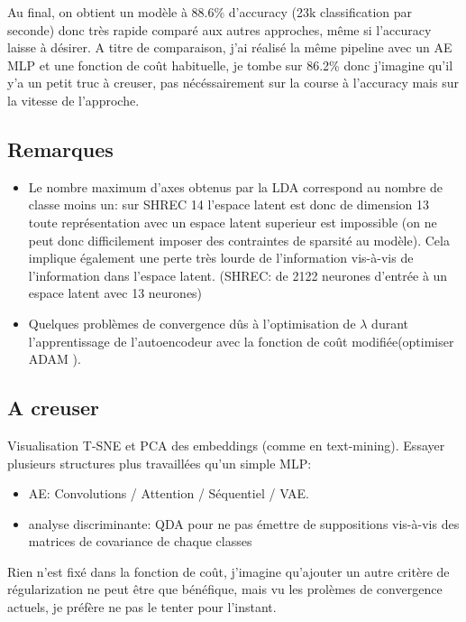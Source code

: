 Au final, on obtient un modèle à 88.6\% d'accuracy (23k classification par seconde) donc très rapide comparé aux autres approches, même si l'accuracy laisse à désirer. A titre de comparaison, j'ai réalisé la même pipeline avec un AE MLP et une fonction de coût habituelle, je tombe sur 86.2\% donc j'imagine qu'il y'a un petit truc à creuser, pas nécéssairement sur la course à l'accuracy mais sur la vitesse de l'approche.

\subsection{Remarques}
\begin{itemize}
    \item Le nombre maximum d'axes obtenus par la LDA correspond au nombre de classe moins un: sur SHREC 14 l'espace latent est donc de dimension 13 toute représentation avec un espace latent superieur est impossible (on ne peut donc difficilement imposer des contraintes de sparsité au modèle). Cela implique également une perte très lourde de l'information vis-à-vis de l'information dans l'espace latent. (SHREC: de 2122 neurones d'entrée à un espace latent avec 13 neurones)
    \item Quelques problèmes de convergence dûs à l'optimisation de $\lambda$ durant l'apprentissage de l'autoencodeur avec la fonction de coût modifiée(optimiser ADAM \cite{kingma2014adam}).
\end{itemize}

\subsection{A creuser}



Visualisation T-SNE et PCA des embeddings (comme en text-mining).
Essayer plusieurs structures plus travaillées qu'un simple MLP:
\begin{itemize}
    \item AE: Convolutions / Attention / Séquentiel / VAE.
    \item analyse discriminante: QDA  pour ne pas émettre de suppositions vis-à-vis des matrices de covariance de chaque classes
\end{itemize}

Rien n'est fixé dans la fonction de coût, j'imagine qu'ajouter un autre critère de régularization ne peut être que bénéfique, mais vu les prolèmes de convergence actuels, je préfère ne pas le tenter pour l'instant.

